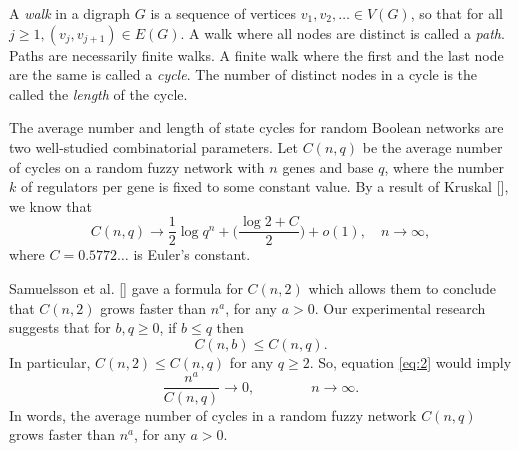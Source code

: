 \documentclass[letterpaper]{article}
\begin{document}
 A \emph{walk} in a digraph $G$ is a sequence of vertices  $v_1,v_2,\dots\in V(G)$, so that for all $j\geq 1, (v_j,v_{j+1})\in E(G)$.
A walk where all nodes are distinct is called a \emph{path}.
Paths are necessarily finite walks.   
A finite walk where the first and the last node are the same is called a \emph{cycle}. 
The number of distinct nodes in a cycle is the called the \emph{length} of the cycle.



The average number and length of state cycles for  random Boolean networks are two well-studied combinatorial parameters. 
 Let $C(n,q)$ be the average number of cycles  
 on a random fuzzy network with $n$ genes and base $q$, where the number $k$ of regulators per gene is fixed to some constant value. By a result of Kruskal [], we know that 
\[
C(n,q)\to\frac{1}{2}\log q^n + \bigg( \frac{\log 2 + C}{2} \bigg) + o(1),\quad n\to\infty,
\]
 where $C=0.5772\dots$ is Euler's constant.
  
 Samuelsson et al. [] gave a formula for $C(n, 2)$ which allows them to conclude that $C(n,2)$ grows faster than $n^{a}$, for any $a>0$.
  Our experimental research suggests that for  $b,q\geq 0$, if $b\leq q$ then
 \begin{equation}
 \label{eq:2}
 C(n,b)\leq C(n,q).
 \end{equation}
  In particular, $C(n,2)\leq C(n,q)$ for any $q\geq 2$.
So, equation \eqref{eq:2} would imply 
 \[
 \frac{n^{a}}{
    C(n,q)} \to 0,\qquad\qquad n\to\infty.
  \]
In words, the average number of cycles in a random fuzzy network  $C(n,q)$ grows faster than $n^{a}$, for any $a>0$. 


% 
\newpage
 
\section{}




\footnotesize
%
\end{document}
